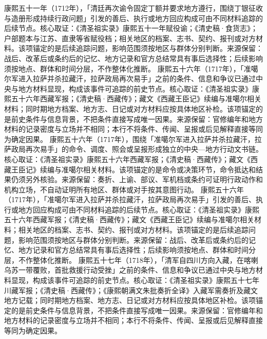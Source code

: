 康熙五十一年（1712年），「清廷再次谕令固定丁额并要求地方遵行，围绕丁银征收与造册形成持续行政问题」引发的善后、执行或地方回应构成可由不同材料追踪的后续节点。核心取证：《清圣祖实录》康熙五十一年赋役谕；《清史稿·食货志》；户部题本与江苏、直隶等省赋役档；相关地区的档案、志书、契约、报刊或对方材料。该项锚定的是后续追踪问题，影响范围须按地区与群体分别判断。来源保留：战后、改革后或条约后的记忆、地方记录和官方总结常具有事后选择性；后续影响须按地点、群体和时间分层，不作整体化推断。
康熙五十六年（1717年），「准噶尔军进入拉萨并杀拉藏汗，拉萨政局再次易手」之前的条件、信息和争议已通过中央与地方材料显现，构成该事件可追踪的前史节点。核心取证：《清圣祖实录》康熙五十六年西藏军报；《清史稿·西藏传》；藏文《西藏王臣记》续编与准噶尔相关材料；同时期地方档案、地方志、日记或对方材料应按具体地区补检。该项锚定的是前史条件与信息背景，不把条件直接写成唯一因果。来源保留：官修编年和地方材料的记录密度与立场并不相同；本行不将条件、传闻、呈报或后见解释直接等同为确定因果。
康熙五十六年（1717年），围绕「准噶尔军进入拉萨并杀拉藏汗，拉萨政局再次易手」的命令、调度、照会或呈报形成独立的中央—地方行动文书链。核心取证：《清圣祖实录》康熙五十六年西藏军报；《清史稿·西藏传》；藏文《西藏王臣记》续编与准噶尔相关材料。该项锚定的是命令或决策环节，命令抵达和结果仍须另外核验。来源保留：奏折、上谕、部议、军机档或条约可证明行政动作和机构立场，不自动证明所有地区、群体或对手按其意图行动。
康熙五十六年（1717年），「准噶尔军进入拉萨并杀拉藏汗，拉萨政局再次易手」引发的善后、执行或地方回应构成可由不同材料追踪的后续节点。核心取证：《清圣祖实录》康熙五十六年西藏军报；《清史稿·西藏传》；藏文《西藏王臣记》续编与准噶尔相关材料；相关地区的档案、志书、契约、报刊或对方材料。该项锚定的是后续追踪问题，影响范围须按地区与群体分别判断。来源保留：战后、改革后或条约后的记忆、地方记录和官方总结常具有事后选择性；后续影响须按地点、群体和时间分层，不作整体化推断。
康熙五十七年（1718年），「清军自四川方向入藏，在喀喇乌苏一带覆败，首批救援行动受挫」之前的条件、信息和争议已通过中央与地方材料显现，构成该事件可追踪的前史节点。核心取证：《清圣祖实录》康熙五十七年川藏军报；《清史稿·西藏传》；《康熙朝满文朱批奏折全译》入藏军需奏折及藏文地方记载；同时期地方档案、地方志、日记或对方材料应按具体地区补检。该项锚定的是前史条件与信息背景，不把条件直接写成唯一因果。来源保留：官修编年和地方材料的记录密度与立场并不相同；本行不将条件、传闻、呈报或后见解释直接等同为确定因果。
